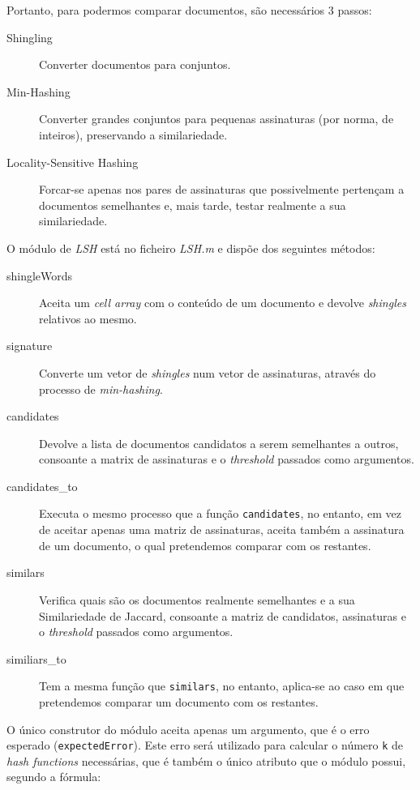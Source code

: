 \documentclass[a4paper,11pt,openright,oneside]{report}
\begin{document}
Portanto, para podermos comparar documentos, são necessários 3 passos:

\begin{description}
\item[Shingling]
Converter documentos para conjuntos.
\item[Min-Hashing]
Converter grandes conjuntos para pequenas assinaturas (por norma, de inteiros), preservando a similariedade.
\item[Locality-Sensitive Hashing]
Forcar-se apenas nos pares de assinaturas que possivelmente pertençam a documentos semelhantes e, mais tarde, testar realmente a sua similariedade.
\end{description}

O módulo de \textit{LSH} está no ficheiro \textit{LSH.m} e dispõe dos seguintes métodos:

\begin{description}
\item[shingleWords]
Aceita um \textit{cell array} com o conteúdo de um documento e devolve \textit{shingles} relativos ao mesmo.
\item[signature]
Converte um vetor de \textit{shingles} num vetor de assinaturas, através do processo de \textit{min-hashing}.
\item[candidates]
Devolve a lista de documentos candidatos a serem semelhantes a outros, consoante a matrix de assinaturas e o \textit{threshold} passados como argumentos.
\item[candidates\_to]
Executa o mesmo processo que a função \texttt{candidates}, no entanto, em vez de aceitar apenas uma matriz de assinaturas, aceita também a assinatura de um documento, o qual pretendemos comparar com os restantes.
\item[similars]
Verifica quais são os documentos realmente semelhantes e a sua Similariedade de Jaccard, consoante a matriz de candidatos, assinaturas e o \textit{threshold} passados como argumentos.
\item[similiars\_to]
Tem a mesma função que \texttt{similars}, no entanto, aplica-se ao caso em que pretendemos comparar um documento com os restantes.
\end{description}

O único construtor do módulo aceita apenas um argumento, que é o erro esperado (\texttt{expectedError}). Este erro será utilizado para calcular o número \texttt{k} de \textit{hash functions} necessárias, que é também o único atributo que o módulo possui, segundo a fórmula:
\end{document}

